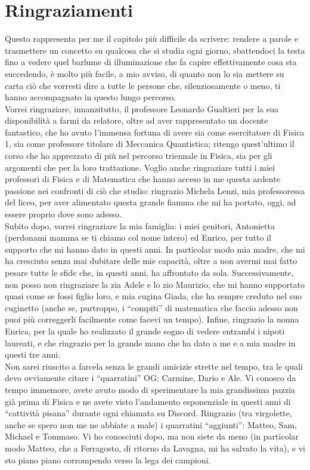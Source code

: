 \chapter*{Ringraziamenti}

Questo rappresenta per me il capitolo più difficile da scrivere: rendere a parole e trasmettere un concetto su qualcosa che si studia ogni giorno, sbattendoci la testa fino a vedere quel barlume di illuminazione che fa capire effettivamente cosa sta succedendo, è molto più facile, a mio avviso, di quanto non lo sia mettere su carta ciò che vorresti dire a tutte le persone che, silenziosamente o meno, ti hanno accompagnato in questo lungo percorso. \\
Vorrei ringraziare, innanzitutto, il professore Leonardo Gualtieri per la sua disponibilità a farmi da relatore, oltre ad aver rappresentato un docente fantastico, che ho avuto l'immensa fortuna di avere sia come esercitatore di Fisica 1, sia come professore titolare di Meccanica Quantistica; ritengo quest'ultimo il corso che ho apprezzato di più nel percorso triennale in Fisica, sia per gli argomenti che per la loro trattazione. Voglio anche ringraziare tutti i miei professori di Fisica e di Matematica che hanno acceso in me questa ardente passione nei confronti di ciò che studio: ringrazio Michela Lenzi, mia professoressa del liceo, per aver alimentato questa grande fiamma che mi ha portato, oggi, ad essere proprio dove sono adesso. \\
Subito dopo, vorrei ringraziare la mia famiglia: i miei genitori, Antonietta (perdonami mamma se ti chiamo col nome intero) ed Enrico, per tutto il supporto che mi hanno dato in questi anni. In particolar modo mia madre, che mi ha cresciuto senza mai dubitare delle mie capacità, oltre a non avermi mai fatto pesare tutte le sfide che, in questi anni, ha affrontato da sola. Successivamente, non posso non ringraziare la zia Adele e lo zio Maurizio, che mi hanno supportato quasi come se fossi figlio loro, e mia cugina Giada, che ha sempre creduto nel suo cuginetto (anche se, purtroppo, i ``compiti'' di matematica che faccio adesso non puoi più correggerli facilmente come facevi un tempo). Infine, ringrazio la nonna Enrica, per la quale ho realizzato il grande sogno di vedere entrambi i nipoti laureati, e che ringrazio per la grande mano che ha dato a me e a mia madre in questi tre anni. \\
Non sarei riuscito a farcela senza le grandi amicizie strette nel tempo, tra le quali devo ovviamente citare i ``quarratini'' OG: Carmine, Dario e Ale. Vi conosco da tempo immemore, avete avuto modo di sperimentare la mia grandissima pazzia già prima di Fisica e ne avete visto l'andamento esponenziale in questi anni di ``cattività pisana'' durante ogni chiamata su Discord. Ringrazio (tra virgolette, anche se spero non me ne abbiate a male) i quarratini ``aggiunti'': Matteo, Sam, Michael e Tommaso. Vi ho conosciuti dopo, ma non siete da meno (in particolar modo Matteo, che a Ferragosto, di ritorno da Lavagna, mi ha salvato la vita), e vi sto piano piano corrompendo verso la lega dei campioni. \\

